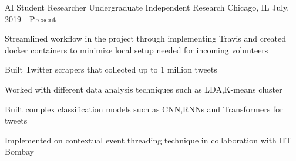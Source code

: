 \begin{cventries}
  \cventry
    {AI Student Researcher} %
    {Undergraduate Independent Research} %
    {Chicago, IL} %
    {July. 2019 - Present} %
    {
      \begin{cvitems} %
        \item {Streamlined workflow in the project through implementing Travis and created docker containers to minimize local setup needed for incoming volunteers}
        \item {Built Twitter scrapers that collected up to 1 million tweets}
        \item {Worked with different data analysis techniques such as LDA,K-means cluster}
        \item {Built complex classification models such as CNN,RNNs and Transformers for tweets}
        \item {Implemented on contextual event threading technique in collaboration with IIT Bombay}
      \end{cvitems}
    }


  

\end{cventries}
